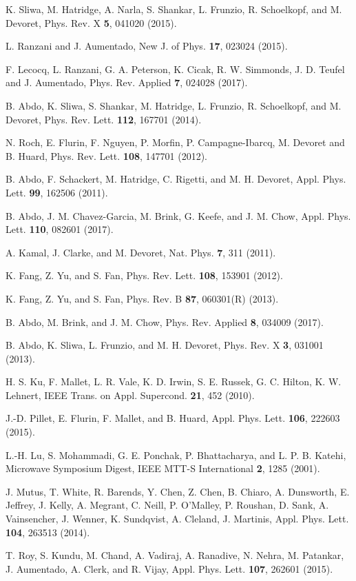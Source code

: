 \documentclass[aip,onecolumn,10pt]{revtex4}%
\begin{document}
\begin{thebibliography}{99}
	 K. Sliwa, M. Hatridge, A. Narla, S. Shankar, L. Frunzio, R. Schoelkopf, and M. Devoret, Phys. Rev. X \textbf{5}, 041020 (2015).
	
	 L. Ranzani and J. Aumentado, New J. of Phys. \textbf{17}, 023024 (2015). 
	
	 F. Lecocq, L. Ranzani, G. A. Peterson, K. Cicak, R. W. Simmonds, J. D. Teufel and J. Aumentado, Phys. Rev. Applied \textbf{7}, 024028 (2017). 
	
	 B. Abdo, K. Sliwa, S. Shankar, M. Hatridge, L. Frunzio, R. Schoelkopf, and M. Devoret, Phys. Rev. Lett. \textbf{112}, 167701 (2014).
	
	N. Roch, E. Flurin, F. Nguyen, P. Morﬁn, P. Campagne-Ibarcq, M. Devoret and B. Huard, Phys. Rev. Lett. \textbf{108}, 147701 (2012).
	
	B. Abdo, F. Schackert, M. Hatridge, C. Rigetti, and M. H. Devoret, Appl. Phys. Lett. \textbf{99}, 162506 (2011).
	
	 B. Abdo, J. M. Chavez-Garcia, M. Brink, G. Keefe, and J. M. Chow, Appl. Phys. Lett. \textbf{110}, 082601 (2017).
	
	 A. Kamal, J. Clarke, and M. Devoret, Nat. Phys. \textbf{7}, 311 (2011).
	
	 K. Fang, Z. Yu, and S. Fan, Phys. Rev. Lett. \textbf{108}, 153901 (2012).
	
	 K. Fang, Z. Yu, and S. Fan, Phys. Rev. B \textbf{87}, 060301(R) (2013).
	
	 B. Abdo, M. Brink, and J. M. Chow, Phys. Rev. Applied \textbf{8}, 034009 (2017).
	
	 B. Abdo, K. Sliwa, L. Frunzio, and M. H. Devoret, Phys. Rev. X \textbf{3}, 031001 (2013).
	
	 H. S. Ku, F. Mallet, L. R. Vale, K. D. Irwin, S. E. Russek, G. C. Hilton, K. W. Lehnert, IEEE Trans. on Appl. Supercond. \textbf{21}, 452 (2010).
	
	 J.-D. Pillet, E. Flurin, F. Mallet, and B. Huard, Appl. Phys. Lett. \textbf{106}, 222603 (2015).
	
	 L.-H. Lu, S. Mohammadi, G. E. Ponchak, P. Bhattacharya, and L. P. B. Katehi, Microwave Symposium Digest, IEEE MTT-S International \textbf{2}, 1285 (2001).
	
	 J. Mutus, T. White, R. Barends, Y. Chen, Z. Chen, B. Chiaro, A. Dunsworth, E. Jeffrey, J. Kelly, A. Megrant, C. Neill, P. O’Malley, P. Roushan, D. Sank, A. Vainsencher, J. Wenner, K. Sundqvist, A. Cleland, J. Martinis,  Appl. Phys. Lett. \textbf{104}, 263513 (2014).
	
	T. Roy, S. Kundu, M. Chand, A. Vadiraj, A. Ranadive, N. Nehra, M. Patankar, J. Aumentado, A. Clerk, and R. Vijay, Appl. Phys. Lett. \textbf{107}, 262601 (2015).
	
\end{thebibliography}
\end{document}
